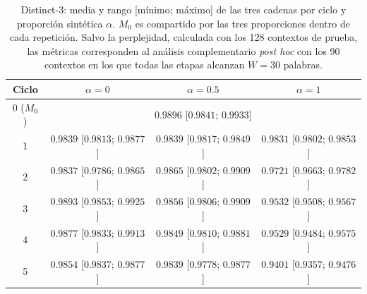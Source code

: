 
\begin{table}[ht]
\centering
\footnotesize
\begin{tabular}{c c c c}
\hline
Ciclo & $\alpha=0$ & $\alpha=0.5$ & $\alpha=1$ \\
\hline
0 ($M_0$) & \multicolumn{3}{c}{$0.9896$ [$0.9841$; $0.9933$]} \\
1 & $0.9839$ [$0.9813$; $0.9877$] & $0.9839$ [$0.9817$; $0.9849$] & $0.9831$ [$0.9802$; $0.9853$] \\
2 & $0.9837$ [$0.9786$; $0.9865$] & $0.9865$ [$0.9802$; $0.9909$] & $0.9721$ [$0.9663$; $0.9782$] \\
3 & $0.9893$ [$0.9853$; $0.9925$] & $0.9856$ [$0.9806$; $0.9909$] & $0.9532$ [$0.9508$; $0.9567$] \\
4 & $0.9877$ [$0.9833$; $0.9913$] & $0.9849$ [$0.9810$; $0.9881$] & $0.9529$ [$0.9484$; $0.9575$] \\
5 & $0.9854$ [$0.9837$; $0.9877$] & $0.9839$ [$0.9778$; $0.9877$] & $0.9401$ [$0.9357$; $0.9476$] \\
\hline
\end{tabular}
\caption{Distinct-3: media y rango [mínimo; máximo] de las tres cadenas por ciclo y proporción sintética $\alpha$. $M_0$ es compartido por las tres proporciones dentro de cada repetición. Salvo la perplejidad, calculada con los 128 contextos de prueba, las métricas corresponden al análisis complementario \textit{post hoc} con los 90 contextos en los que todas las etapas alcanzan $W=30$ palabras.}
\label{tab:medias_distinct_3}
\end{table}
